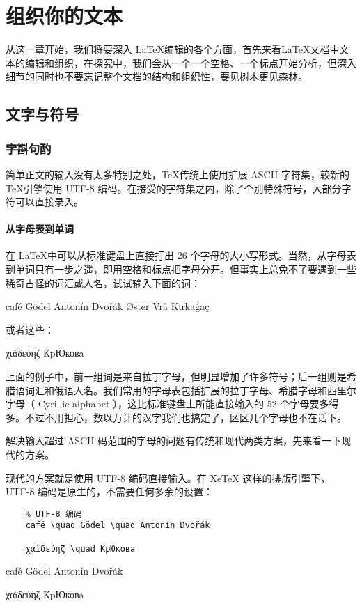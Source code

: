 \chapter{组织你的文本}

从这一章开始，我们将要深入 \LaTeX 编辑的各个方面，首先来看\LaTeX 文档中文本的编辑和组织，在探究中，我们会从一个一个空格、一个标点开始分析，但深入细节的同时也不要忘记整个文档的结构和组织性，要见树木更见森林。

\section{文字与符号}

\subsection{字斟句酌}

简单正文的输入没有太多特别之处，\TeX 传统上使用扩展 ASCII 字符集，较新的\TeX 引擎使用 UTF-8 编码。在接受的字符集之内，除了个别特殊符号，大部分字符可以直接录入。

\subsubsection{从字母表到单词}

在 \LaTeX 中可以从标准键盘上直接打出 26 个字母的大小写形式。当然，从字母表到单词只有一步之遥，即用空格和标点把字母分开。但事实上总免不了要遇到一些稀奇古怪的词汇或人名，试试输入下面的词：
\begin{center}
    café \quad Gödel \quad Antonín Dvořák \quad Øster Vrå \quad Kιrkağaç
\end{center}

或者这些：
\begin{center}
    χαïδεύηζ \quad КpЮковa
\end{center}

上面的例子中，前一组词是来自拉丁字母，但明显增加了许多符号；后一组则是希腊语词汇和俄语人名。我们常用的字母表包括扩展的拉丁字母、希腊字母和西里尔字母（ Cyrillic alphabet ），这比标准键盘上所能直接输入的 52 个字母要多得多。不过不用担心，数以万计的汉字我们也搞定了，区区几个字母也不在话下。

解决输入超过 ASCII 码范围的字母的问题有传统和现代两类方案，先来看一下现代的方案。

现代的方案就是使用 UTF-8 编码直接输入。在 XeTeX 这样的排版引擎下， UTF-8 编码是原生的，不需要任何多余的设置：

\begin{minipage}[t]{0.45\textwidth}
    \begin{lstlisting}
    % UTF-8 编码
    café \quad Gödel \quad Antonín Dvořák

    χαïδεύηζ \quad КpЮковa
    \end{lstlisting}
\end{minipage}
\hfill
\begin{minipage}[t]{0.45\textwidth}
    \vspace{0.1cm}
    \hspace{0.5cm}

    café \quad Gödel \quad Antonín Dvořák

    χαïδεύηζ \quad КpЮковa
\end{minipage}


